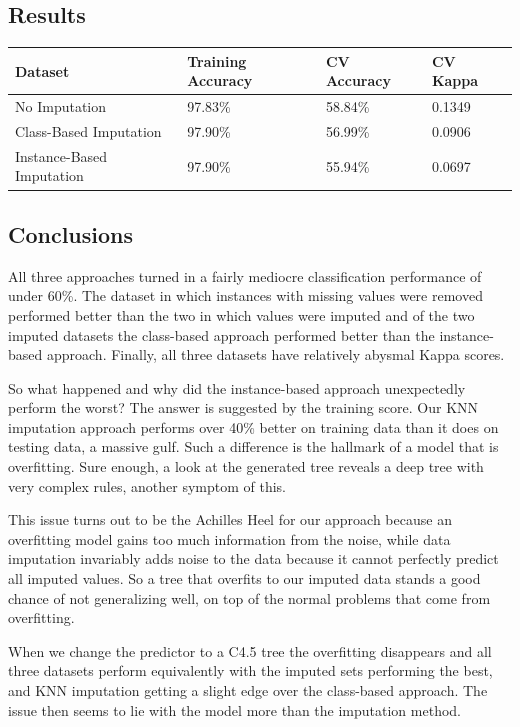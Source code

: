 \documentclass[11pt, letterpaper]{report}
\begin{document}
\subsection{Results}

\begin{tabular}{ |l l l l| }
    \hline
    \textbf{Dataset} & \textbf{Training Accuracy} & \textbf{CV Accuracy} & \textbf{CV Kappa} \\ \hline
    No Imputation & 97.83\% & 58.84\% & 0.1349 \\
    Class-Based Imputation & 97.90\% & 56.99\% & 0.0906 \\
    Instance-Based Imputation & 97.90\% & 55.94\% & 0.0697 \\
    \hline
\end{tabular}

\subsection{Conclusions}

All three approaches turned in a fairly mediocre classification performance of under 60\%. The dataset in which instances with missing values were removed performed better than the two in which values were imputed and of the two imputed datasets the class-based approach performed better than the instance-based approach. Finally, all three datasets have relatively abysmal Kappa scores.

So what happened and why did the instance-based approach unexpectedly perform the worst? The answer is suggested by the training score. Our KNN imputation approach performs over 40\% better on training data than it does on testing data, a massive gulf. Such a difference is the hallmark of a model that is overfitting. Sure enough, a look at the generated tree reveals a deep tree with very complex rules, another symptom of this.

This issue turns out to be the Achilles Heel for our approach because an overfitting model gains too much information from the noise, while data imputation invariably adds noise to the data because it cannot perfectly predict all imputed values. So a tree that overfits to our imputed data stands a good chance of not generalizing well, on top of the normal problems that come from overfitting.

When we change the predictor to a C4.5 tree the overfitting disappears and all three datasets perform equivalently with the imputed sets performing the best, and KNN imputation getting a slight edge over the class-based approach. The issue then seems to lie with the model more than the imputation method.
\end{document}

